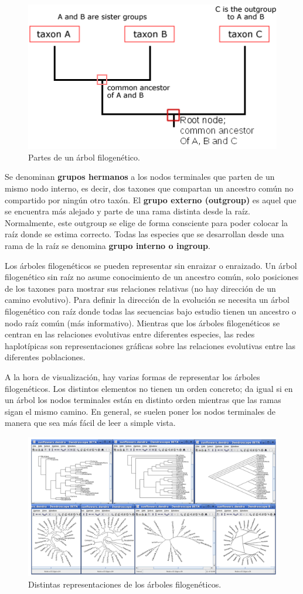 \begin{figure}[htbp]
\centering
\includegraphics[width=0.5\linewidth]{figs/taxon-tree.png}
\caption{Partes de un árbol filogenético.}
\end{figure}

Se denominan \textbf{grupos hermanos} a los nodos terminales que parten de un mismo nodo interno, es decir, dos taxones que compartan un ancestro común no compartido por ningún otro taxón. El \textbf{grupo externo (outgroup)} es aquel que se encuentra más alejado y parte de una rama distinta desde la raíz. Normalmente, este outgroup se elige de forma consciente para poder colocar la raíz donde se estima correcto. Todas las especies que se desarrollan desde una rama de la raíz se denomina \textbf{grupo interno o ingroup}. 

Los árboles filogenéticos se pueden representar sin enraizar o enraizado. Un árbol filogenético sin raíz no asume conocimiento de un ancestro común, solo posiciones de los taxones para mostrar sus relaciones relativas (no hay dirección de un camino evolutivo). Para definir la dirección de la evolución se necesita un árbol filogenético con raíz donde todas las secuencias bajo estudio tienen un ancestro o nodo raíz común (más informativo). Mientras que los árboles filogenéticos se centran en las relaciones evolutivas entre diferentes especies, las redes haplotípicas son representaciones gráficas sobre las relaciones evolutivas entre las diferentes poblaciones.

A la hora de visualización, hay varias formas de representar los árboles filogenéticos. Los distintos elementos no tienen un orden concreto; da igual si en un árbol los nodos terminales están en distinto orden mientras que las ramas sigan el mismo camino. En general, se suelen poner los nodos terminales de manera que sea más fácil de leer a simple vista.

\begin{figure}[htbp]
\centering
\includegraphics[width=0.5\linewidth]{figs/representaciones-arboles.png}
\caption{Distintas representaciones de los árboles filogenéticos.}
\end{figure}

